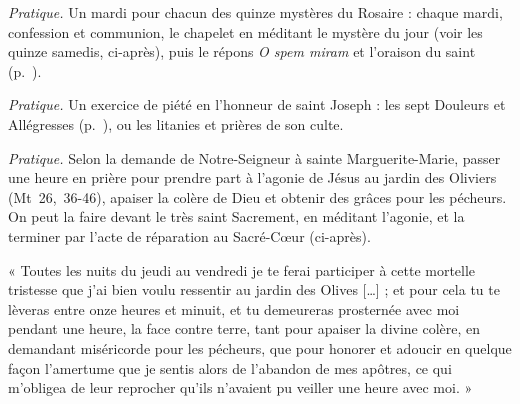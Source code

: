 \documentclass{bibliotheca-missel}
\begin{document}
\begin{notice}\textit{Pratique.} Un mardi pour chacun des quinze mystères du Rosaire : chaque mardi, confession et communion, le chapelet en méditant le mystère du jour (voir les quinze samedis, ci-après), puis le répons \textit{O spem miram} et l’oraison du saint (p.~\pageref{dominique}).\end{notice}


\begin{notice}\textit{Pratique.} Un exercice de piété en l’honneur de saint Joseph : les sept Douleurs et Allégresses (p.~\pageref{joseph}), ou les litanies et prières de son culte.\end{notice}


\begin{notice}\textit{Pratique.} Selon la demande de Notre-Seigneur à sainte Marguerite-Marie, passer une heure en prière pour prendre part à l’agonie de Jésus au jardin des Oliviers (Mt~26,~36-46), apaiser la colère de Dieu et obtenir des grâces pour les pécheurs. On peut la faire devant le très saint Sacrement, en méditant l’agonie, et la terminer par l’acte de réparation au Sacré-Cœur (ci-après).\end{notice}
\begin{notice}
« Toutes les nuits du jeudi au vendredi je te ferai participer à cette mortelle tristesse que j’ai bien voulu ressentir au jardin des Olives […] ; et pour cela tu te lèveras entre onze heures et minuit, et tu demeureras prosternée avec moi pendant une heure, la face contre terre, tant pour apaiser la divine colère, en demandant miséricorde pour les pécheurs, que pour honorer et adoucir en quelque façon l’amertume que je sentis alors de l’abandon de mes apôtres, ce qui m’obligea de leur reprocher qu’ils n’avaient pu veiller une heure avec moi. »
\end{notice}
\end{document}

